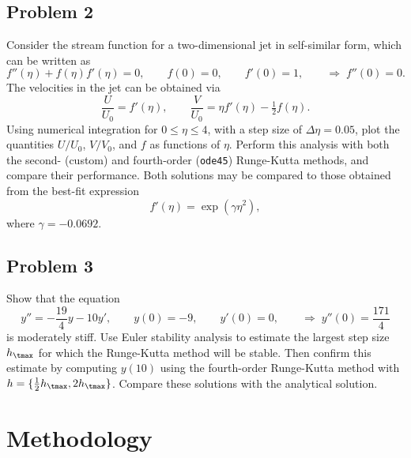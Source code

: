 \documentclass[12pt]{article}
\begin{document}
\subsection{Problem 2}

Consider the stream function for a two-dimensional jet in self-similar form, which can be written as
\begin{equation}
f''(\eta) + f(\eta) f'(\eta) = 0 ,\qquad
f(0) = 0 ,\qquad
f'(0) = 1 ,\qquad
\Rightarrow \;
f''(0) = 0
.
\label{eq:prob2}
\end{equation}
The velocities in the jet can be obtained via
\begin{equation}
\frac{U}{U_0} = f'(\eta) ,\qquad
\frac{V}{U_0} = \eta f'(\eta) - \tfrac{1}{2} f(\eta)
.
\label{eq:prob2_velocities}
\end{equation}
Using numerical integration for $0 \le \eta \le 4$, with a step size of $\Delta \eta = 0.05$, plot the quantities $U/U_0$, $V/V_0$, and $f$ as functions of $\eta$. Perform this analysis with both the second- (custom) and fourth-order (\lstinline|ode45|) Runge-Kutta methods, and compare their performance. Both solutions may be compared to those obtained from the best-fit expression
\begin{equation}
f'(\eta) = \exp(\gamma \eta^2)
,
\label{eq:prob2_bestfit}
\end{equation}
where $\gamma = -0.0692$.

\subsection{Problem 3}

Show that the equation
\begin{equation}
y'' = -\frac{19}{4} y - 10 y' ,\qquad
y(0) = -9 ,\qquad
y'(0) = 0 ,\qquad
\Rightarrow \;
y''(0) = \frac{171}{4}
\label{eq:prob3}
\end{equation}
is moderately stiff. Use Euler stability analysis to estimate the largest step size $h_\tmax$ for which the Runge-Kutta method will be stable. Then confirm this estimate by computing $y(10)$ using the fourth-order Runge-Kutta method with $h = \{ \tfrac{1}{2} h_\tmax, 2 h_\tmax\}$. Compare these solutions with the analytical solution.

\section{Methodology} %
\end{document}
